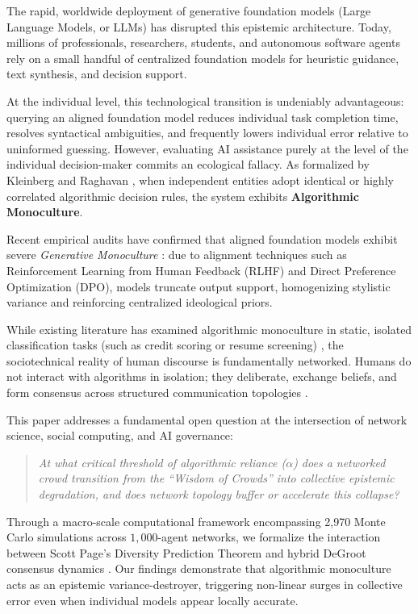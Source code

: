 \documentclass[10pt,twocolumn]{article}
\begin{document}
The rapid, worldwide deployment of generative foundation models (Large Language Models, or LLMs) has disrupted this epistemic architecture. Today, millions of professionals, researchers, students, and autonomous software agents rely on a small handful of centralized foundation models for heuristic guidance, text synthesis, and decision support. 

At the individual level, this technological transition is undeniably advantageous: querying an aligned foundation model reduces individual task completion time, resolves syntactical ambiguities, and frequently lowers individual error relative to uninformed guessing. However, evaluating AI assistance purely at the level of the individual decision-maker commits an ecological fallacy. As formalized by Kleinberg and Raghavan \cite{kleinberg2021algorithmic}, when independent entities adopt identical or highly correlated algorithmic decision rules, the system exhibits \textbf{Algorithmic Monoculture}.

Recent empirical audits have confirmed that aligned foundation models exhibit severe \textit{Generative Monoculture} \cite{bommasani2024generative}: due to alignment techniques such as Reinforcement Learning from Human Feedback (RLHF) and Direct Preference Optimization (DPO), models truncate output support, homogenizing stylistic variance and reinforcing centralized ideological priors. 

While existing literature has examined algorithmic monoculture in static, isolated classification tasks (such as credit scoring or resume screening) \cite{kleinberg2021algorithmic}, the sociotechnical reality of human discourse is fundamentally networked. Humans do not interact with algorithms in isolation; they deliberate, exchange beliefs, and form consensus across structured communication topologies \cite{watts1998collective, barabasi1999emergence, golub2010naive}.

This paper addresses a fundamental open question at the intersection of network science, social computing, and AI governance:
\begin{quote}
\textit{At what critical threshold of algorithmic reliance ($\alpha$) does a networked crowd transition from the ``Wisdom of Crowds'' into collective epistemic degradation, and does network topology buffer or accelerate this collapse?}
\end{quote}

Through a macro-scale computational framework encompassing 2,970 Monte Carlo simulations across $1,000$-agent networks, we formalize the interaction between Scott Page's Diversity Prediction Theorem \cite{page2007difference} and hybrid DeGroot consensus dynamics \cite{degroot1974reaching, golub2010naive}. Our findings demonstrate that algorithmic monoculture acts as an epistemic variance-destroyer, triggering non-linear surges in collective error even when individual models appear locally accurate.
\end{document}
